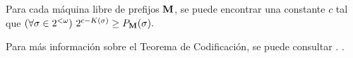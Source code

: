 \begin{teorema}\label{intro:thm:coding} Para cada máquina libre de prefijos ${\bf M}$, se puede encontrar una constante $c$ tal que $ (\forall
\sigma\in2^{<\omega})\ 2^{c-K(\sigma)}\geq P_{{\bf M}}(\sigma). $
\end{teorema}

Para más información sobre el Teorema de Codificación, se puede consultar \cite{li2013introduction}.
\cite{DHBook}.

\bigskip





